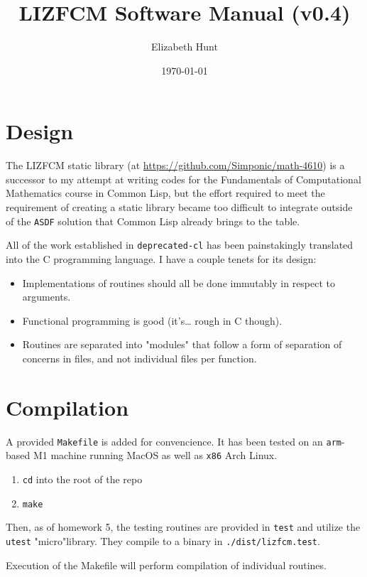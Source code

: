 \documentclass[11pt]{article}
\author{Elizabeth Hunt}
\date{\today}
\title{LIZFCM Software Manual (v0.4)}
\begin{document}
\maketitle
\tableofcontents

\setlength\parindent{0pt}
\section{Design}
\label{sec:org78303cd}
The LIZFCM static library (at \url{https://github.com/Simponic/math-4610}) is a successor to my
attempt at writing codes for the Fundamentals of Computational Mathematics course in Common
Lisp, but the effort required to meet the requirement of creating a static library became
too difficult to integrate outside of the \texttt{ASDF} solution that Common Lisp already brings
to the table.

All of the work established in \texttt{deprecated-cl} has been painstakingly translated into
the C programming language. I have a couple tenets for its design:

\begin{itemize}
\item Implementations of routines should all be done immutably in respect to arguments.
\item Functional programming is good (it's\ldots{} rough in C though).
\item Routines are separated into "modules" that follow a form of separation of concerns
in files, and not individual files per function.
\end{itemize}
\section{Compilation}
\label{sec:orgb417494}
A provided \texttt{Makefile} is added for convencience. It has been tested on an \texttt{arm}-based M1 machine running
MacOS as well as \texttt{x86} Arch Linux.

\begin{enumerate}
\item \texttt{cd} into the root of the repo
\item \texttt{make}
\end{enumerate}

Then, as of homework 5, the testing routines are provided in \texttt{test} and utilize the
\texttt{utest} "micro"library. They compile to a binary in \texttt{./dist/lizfcm.test}.

Execution of the Makefile will perform compilation of individual routines.
\end{document}
